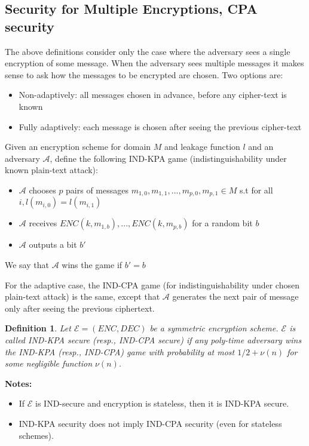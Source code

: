 \documentclass[12pt]{article}
\newcommand{\adv}{\mathcal{A}}
\newtheorem{definition}{Definition}[section]
\begin{document}
\subsection{Security for Multiple Encryptions, CPA security}
The above definitions consider only the case where the adversary sees a single encryption of some message. When the adversary sees multiple messages it makes sense to ask how the messages to be encrypted are chosen. Two options are:
\begin{itemize}
\item Non-adaptively: all messages chosen in advance, before any cipher-text is known
\item Fully adaptively: each message is chosen after seeing the previous cipher-text
\end{itemize}
Given an encryption scheme for domain $M$ and leakage function $l$ and an adversary $\adv$, define the following IND-KPA game (indistinguishability under known plain-text attack):
\begin{itemize}
\item $\adv$ chooses $p$ pairs of messages $m_{1,0},m_{1,1},...,m_{p,0},m_{p,1} \in M$ s.t for all $i, l(m_{i,0}) = l(m_{i,1})$
\item $\adv$ receives $ENC(k,m_{1,b}),...,ENC(k,m_{p,b})$ for a random bit $b$
\item $\adv$ outputs a bit $b'$
\end{itemize}
We say that $\adv$ wins the game if $b' = b$

For the adaptive case, the IND-CPA game (for indistinguishability under chosen plain-text attack) is the same, except that $\adv$ generates the next pair of message only after seeing the previous ciphertext.

\begin{definition}
Let $\mathcal{E} = (ENC,DEC)$ be a symmetric encryption scheme. $\mathcal{E}$ is called IND-KPA secure (resp., IND-CPA secure) if any poly-time adversary wins the IND-KPA (resp., IND-CPA) game with probability at most $1/2+\nu(n)$ for some negligible function $\nu(n)$.
\end{definition}
\textbf{Notes:}\\
\begin{itemize}
\item If $\mathcal{E}$ is IND-secure and encryption is stateless, then it is IND-KPA secure.
\item IND-KPA security does not imply IND-CPA security (even for stateless schemes).
\end{itemize}
\end{document}
